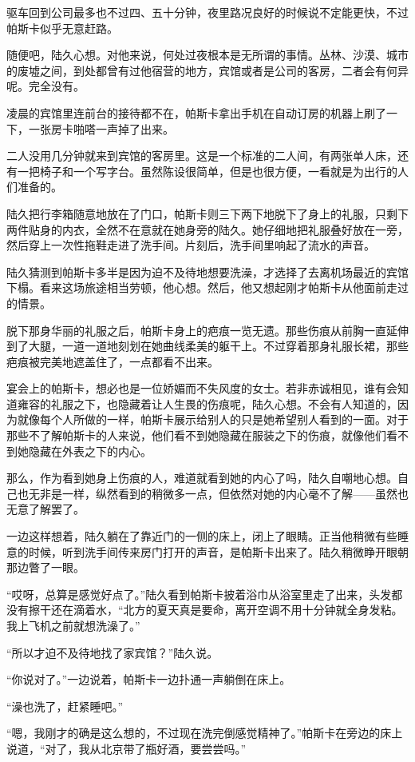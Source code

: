 驱车回到公司最多也不过四、五十分钟，夜里路况良好的时候说不定能更快，不过帕斯卡似乎无意赶路。

随便吧，陆久心想。对他来说，何处过夜根本是无所谓的事情。丛林、沙漠、城市的废墟之间，到处都曾有过他宿营的地方，宾馆或者是公司的客房，二者会有何异呢。完全没有。

凌晨的宾馆里连前台的接待都不在，帕斯卡拿出手机在自动订房的机器上刷了一下，一张房卡啪嗒一声掉了出来。

二人没用几分钟就来到宾馆的客房里。这是一个标准的二人间，有两张单人床，还有一把椅子和一个写字台。虽然陈设很简单，但是也很方便，一看就是为出行的人们准备的。

陆久把行李箱随意地放在了门口，帕斯卡则三下两下地脱下了身上的礼服，只剩下两件贴身的内衣，全然不在意就在她身旁的陆久。她仔细地把礼服叠好放在一旁，然后穿上一次性拖鞋走进了洗手间。片刻后，洗手间里响起了流水的声音。

陆久猜测到帕斯卡多半是因为迫不及待地想要洗澡，才选择了去离机场最近的宾馆下榻。看来这场旅途相当劳顿，他心想。然后，他又想起刚才帕斯卡从他面前走过的情景。

脱下那身华丽的礼服之后，帕斯卡身上的疤痕一览无遗。那些伤痕从前胸一直延伸到了大腿，一道一道地刻划在她曲线柔美的躯干上。不过穿着那身礼服长裙，那些疤痕被完美地遮盖住了，一点都看不出来。

宴会上的帕斯卡，想必也是一位娇媚而不失风度的女士。若非赤诚相见，谁有会知道雍容的礼服之下，也隐藏着让人生畏的伤痕呢，陆久心想。不会有人知道的，因为就像每个人所做的一样，帕斯卡展示给别人的只是她希望别人看到的一面。对于那些不了解帕斯卡的人来说，他们看不到她隐藏在服装之下的伤痕，就像他们看不到她隐藏在外表之下的内心。

那么，作为看到她身上伤痕的人，难道就看到她的内心了吗，陆久自嘲地心想。自己也无非是一样，纵然看到的稍微多一点，但依然对她的内心毫不了解——虽然也无意了解罢了。

一边这样想着，陆久躺在了靠近门的一侧的床上，闭上了眼睛。正当他稍微有些睡意的时候，听到洗手间传来房门打开的声音，是帕斯卡出来了。陆久稍微睁开眼朝那边瞥了一眼。

“哎呀，总算是感觉好点了。”陆久看到帕斯卡披着浴巾从浴室里走了出来，头发都没有擦干还在滴着水，“北方的夏天真是要命，离开空调不用十分钟就全身发粘。我上飞机之前就想洗澡了。”

“所以才迫不及待地找了家宾馆？”陆久说。

“你说对了。”一边说着，帕斯卡一边扑通一声躺倒在床上。

“澡也洗了，赶紧睡吧。”

“嗯，我刚才的确是这么想的，不过现在洗完倒感觉精神了。”帕斯卡在旁边的床上说道，“对了，我从北京带了瓶好酒，要尝尝吗。”

